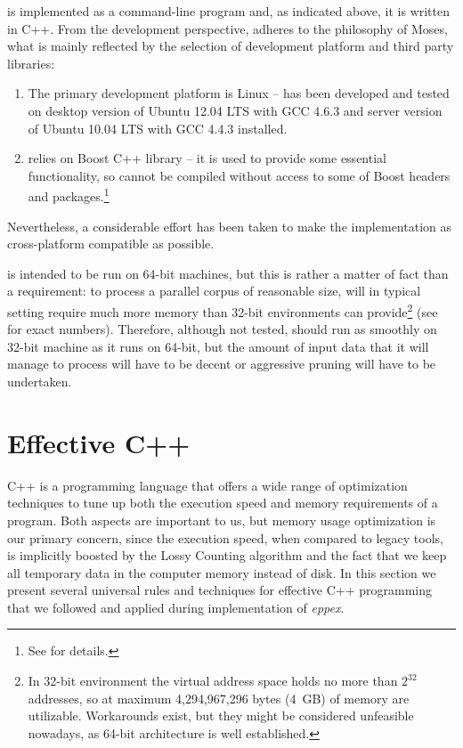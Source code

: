 
\Eppex{} is implemented as a command-line program and, as indicated above, it is written in C++.
From the development perspective, \eppex{} adheres to the philosophy of Moses, what is mainly
reflected by the selection of development platform and third party libraries:
\begin{enumerate}
  \item The primary development platform is Linux --
  \eppex{} has been developed and tested on desktop version of Ubuntu 12.04 LTS with GCC 4.6.3 and
  server version of Ubuntu 10.04 LTS with GCC 4.4.3 installed. %
  \item \Eppex{} relies on Boost C++ library -- it is used to provide
  some essential functionality, so \eppex{} cannot be compiled without access to some of Boost
  headers and packages.\footnote{See  for details.}
\end{enumerate}
Nevertheless, a considerable effort has been taken to make the implementation as cross-platform
compatible as possible.

\Eppex{} is intended to be run on 64-bit machines, but this is rather a matter of fact than
a requirement: to process a parallel corpus of reasonable size, \eppex{} will in typical
setting require much more memory than 32-bit environments can provide\footnote{In 32-bit
environment the virtual address space holds no more than $2^{32}$ addresses, so at maximum
4,294,967,296 bytes (4~GB) of memory are utilizable. Workarounds exist, but they might be
considered unfeasible nowadays, as 64-bit architecture is well established.} (see 
for exact numbers).
Therefore, although not tested, \eppex{} should run as smoothly on 32-bit machine as it runs
on 64-bit, but the amount of input data that it will manage to process will have to be decent
or aggressive pruning will have to be undertaken.

\section{Effective C++}

C++ is a programming language that offers a wide range of optimization techniques to
tune up both the execution speed and memory requirements of a program.
Both aspects are important to us, but memory usage optimization is our primary concern,
since the execution speed, when compared to legacy tools, is implicitly boosted by
the Lossy Counting algorithm and the fact that we keep all temporary data in the computer
memory instead of disk.
In this section we present several universal rules and techniques for effective C++
programming that we followed and applied during implementation of \emph{eppex}.

